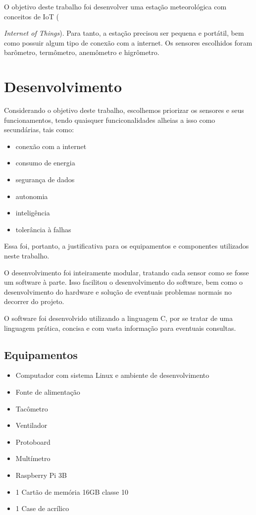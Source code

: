 \documentclass[twocolumn,11pt]{article}
\begin{document}
O objetivo deste trabalho foi desenvolver uma estação meteorológica com conceitos de IoT ({\textit{Internet of Things}). Para tanto, a estação precisou ser pequena e portátil, bem como possuir algum tipo de conexão com a internet. Os sensores escolhidos foram barômetro, termômetro, anemômetro e higrômetro.
\section{Desenvolvimento}
Considerando o objetivo deste trabalho, escolhemos priorizar os sensores e seus funcionamentos, tendo quaisquer funciconalidades alheias a isso como secundárias, tais como:
\begin{itemize}
\item conexão com a internet
\item consumo de energia
\item segurança de dados
\item autonomia
\item inteligência
\item tolerância à falhas
\end{itemize}
Essa foi, portanto, a justificativa para os equipamentos e componentes utilizados neste trabalho.\par
O desenvolvimento foi inteiramente modular, tratando cada sensor como se fosse um software à parte. Isso facilitou o desenvolvimento do software, bem como o desenvolvimento do hardware e solução de eventuais problemas normais no decorrer do projeto.\par
O software foi desenvolvido utilizando a linguagem C, por se tratar de uma linguagem prática, concisa e com vasta informação para eventuais consultas.\par
\subsection{Equipamentos}
\begin{itemize}
\item Computador com sistema Linux e ambiente de desenvolvimento
\item Fonte de alimentação
\item Tacômetro
\item Ventilador
\item Protoboard
\item Multímetro
\item Raspberry Pi 3B
\item 1 Cartão de memória 16GB classe 10
\item 1 Case de acrílico
\end{itemize}
}
\end{document}
